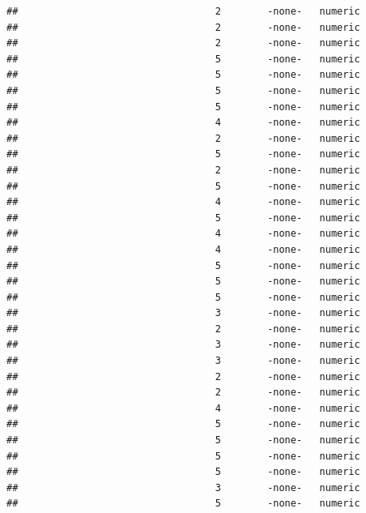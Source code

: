 \documentclass[
  12pt,
]{article}
\begin{document}
\begin{verbatim}
##                                  2        -none-   numeric                    
##                                  2        -none-   numeric                    
##                                  2        -none-   numeric                    
##                                  5        -none-   numeric                    
##                                  5        -none-   numeric                    
##                                  5        -none-   numeric                    
##                                  5        -none-   numeric                    
##                                  4        -none-   numeric                    
##                                  2        -none-   numeric                    
##                                  5        -none-   numeric                    
##                                  2        -none-   numeric                    
##                                  5        -none-   numeric                    
##                                  4        -none-   numeric                    
##                                  5        -none-   numeric                    
##                                  4        -none-   numeric                    
##                                  4        -none-   numeric                    
##                                  5        -none-   numeric                    
##                                  5        -none-   numeric                    
##                                  5        -none-   numeric                    
##                                  3        -none-   numeric                    
##                                  2        -none-   numeric                    
##                                  3        -none-   numeric                    
##                                  3        -none-   numeric                    
##                                  2        -none-   numeric                    
##                                  2        -none-   numeric                    
##                                  4        -none-   numeric                    
##                                  5        -none-   numeric                    
##                                  5        -none-   numeric                    
##                                  5        -none-   numeric                    
##                                  5        -none-   numeric                    
##                                  3        -none-   numeric                    
##                                  5        -none-   numeric                    

\end{verbatim}
\end{document}
